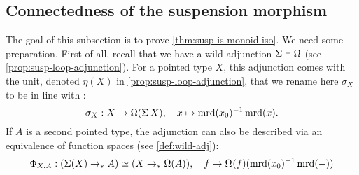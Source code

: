 \documentclass[english,a4paper]{lmcs}
\begin{document}
\subsection{Connectedness of the suspension morphism}
%
The goal of this subsection is to prove \cref{thm:susp-is-monoid-iso}. We need
some preparation.  First of all, recall that we have a wild adjunction $\operatorname{\Sigma}
\dashv \Omega$ (see \cref{prop:susp-loop-adjunction}).
%
For a pointed type $X$, this adjunction comes with the unit, denoted $\eta(X)$
in \cref{prop:susp-loop-adjunction}, that we rename here $\sigma_X$ to be in line
with \cite{HoTT}:
\begin{equation}  \label{eq:sigma}
  \sigma_X : X \to \Omega(\operatorname{\Sigma} X), \quad x \mapsto \operatorname{\mathrm{mrd}}(x_0)^{-1} \operatorname{\mathrm{mrd}}(x).
\end{equation}
If $A$ is a second pointed type, the adjunction can also be described via an
equivalence of function spaces (see \cref{def:wild-adj}):
\begin{equation}\label{eq:adj-equivalence-susp-loopspace}
  \Phi_{X,A} : (\susp(X) \ptdto A) \simeq (X \ptdto \Omega(A)),\quad
  f \mapsto \loopspace \null (f)(\inv{\mrd (x_0)} \mrd(\blank))
\end{equation}
\end{document}
